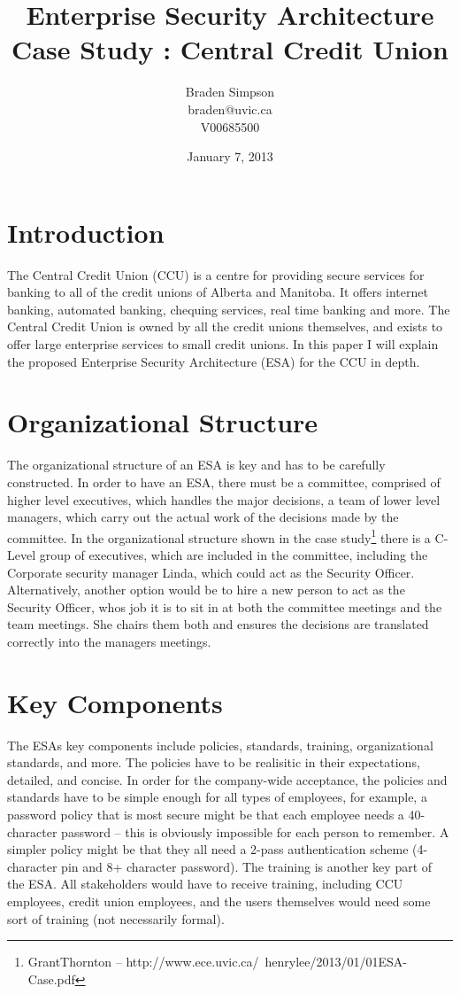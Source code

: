 \documentclass{article}
\title{Enterprise Security Architecture\\Case Study : Central Credit Union}
\author{Braden Simpson\\braden@uvic.ca\\V00685500}
\date{January 7, 2013}
\begin{document}
\maketitle

\section{Introduction}
The Central Credit Union (CCU) is a centre for providing secure services for banking to all of the credit unions of Alberta and Manitoba.  It offers internet banking, automated banking, chequing services, real time banking and more.  The Central Credit Union is owned by all the credit unions themselves, and exists to offer large enterprise services to small credit unions.  In this paper I will explain the proposed Enterprise Security Architecture (ESA) for the CCU in depth.

\section{Organizational Structure}
The organizational structure of an ESA is key and has to be carefully constructed. In order to have an ESA, there must be a committee, comprised of higher level executives, which handles the major decisions, a team of lower level managers, which carry out the actual work of the decisions made by the committee.  In the organizational structure shown in the case study\footnote{GrantThornton -- http://www.ece.uvic.ca/~henrylee/2013/01/01ESA-Case.pdf} there is a C-Level group of executives, which are included in the committee, including the Corporate security manager Linda, which could act as the Security Officer.  Alternatively, another option would be to hire a new person to act as the Security Officer, whos job it is to sit in at both the committee meetings and the team meetings.  She chairs them both and ensures the decisions are translated correctly into the managers meetings. 

\section{Key Components}
The ESAs key components include policies, standards, training, organizational standards, and more.  The policies have to be realisitic in their expectations, detailed, and concise.  In order for the company-wide acceptance, the policies and standards have to be simple enough for all types of employees, for example, a password policy that is most secure might be that each employee needs a 40-character password -- this is obviously impossible for each person to remember.  A simpler policy might be that they all need a 2-pass authentication scheme (4-character pin and 8+ character password).  The training is another key part of the ESA.  All stakeholders would have to receive training, including CCU employees, credit union employees, and the users themselves would need some sort of training (not necessarily formal).  
\end{document}
